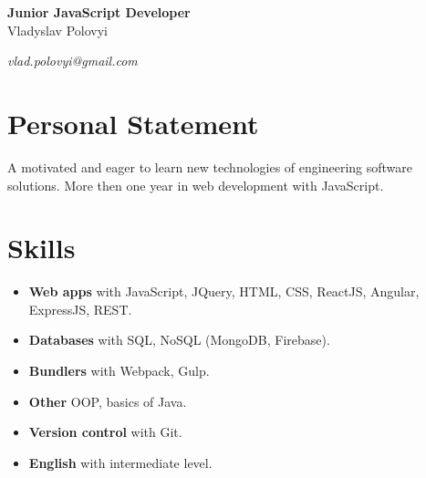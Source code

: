 \documentclass[a4paper]{article}
\begin{document}
	\begin{center}
		{\huge\bfseries Junior JavaScript Developer} \\[1em]
		{\Large Vladyslav Polovyi} \\[1em]
		\faMapMarker \quad \myaddress
	\end{center}
	\vspace{1em}
	\textit{\faPaperPlane \quad vlad.polovyi@gmail.com} \hspace*{\fill} \textit{\faPhone \quad \myphone} 

	\section*{Personal Statement}
	A motivated and eager to learn new technologies of engineering software solutions. More then one year in web development with JavaScript.

	\section*{Skills}
	\begin{multicols}{2}
	\begin{itemize}
		\item \textbf{Web apps} with JavaScript, JQuery, HTML, CSS, ReactJS, Angular, ExpressJS, REST.
		\item \textbf{Databases} with SQL, NoSQL (MongoDB, Firebase).
		\item \textbf{Bundlers} with Webpack, Gulp.
		\item \textbf{Other} OOP, basics of Java.
		\item \textbf{Version control} with Git.
		\item \textbf{English} with intermediate level.
	\end{itemize}
	\end{multicols}
	
\end{document}
